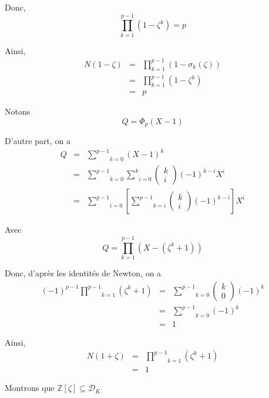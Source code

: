 Donc,
\[ \prod^{p - 1}_{k = 1} (1 - \zeta^k) = p \]


Ainsi,
\begin{eqnarray*}
  N (1 - \zeta) & = & \prod^{p - 1}_{k = 1} (1 - \sigma_k (\zeta))\\
  & = & \prod^{p - 1}_{k = 1} (1 - \zeta^k)\\
  & = & p
\end{eqnarray*}


Notons
\[ Q = \Phi_p (X - 1) \]


D'autre part, on a
\begin{eqnarray*}
  Q & = & \underset{k = 0}{\overset{p - 1}{\sum}} (X - 1)^k\\
  & = & \underset{k = 0}{\overset{p - 1}{\sum}} \underset{i =
  0}{\overset{k}{\sum}} \left( \begin{array}{c}
    k\\
    i
  \end{array} \right) (- 1)^{k - i} X^i\\
  & = & \underset{i = 0}{\overset{p - 1}{\sum}} \left[ \underset{k =
  i}{\overset{p - 1}{\sum}} \left( \begin{array}{c}
    k\\
    i
  \end{array} \right) (- 1)^{k - i} \right] X^i
\end{eqnarray*}


Avec
\[ Q = \underset{k = 1}{\overset{p - 1}{\prod}} (X - (\zeta^k + 1)) \]


Donc, d'apr{\`e}s les identit{\'e}s de Newton, on a
\begin{eqnarray*}
  (- 1)^{p - 1} \underset{k = 1}{\overset{p - 1}{\prod}} (\zeta^k + 1) & = &
  \underset{k = 0}{\overset{p - 1}{\sum}} \left( \begin{array}{c}
    k\\
    0
  \end{array} \right) (- 1)^k\\
  & = & \underset{k = 0}{\overset{p - 1}{\sum}} (- 1)^k\\
  & = & 1
\end{eqnarray*}


Ainsi,
\begin{eqnarray*}
  N (1 + \zeta) & = & \underset{k = 1}{\overset{p - 1}{\prod}} (\zeta^k + 1)\\
  & = & 1
\end{eqnarray*}


 Montrons que $\mathbb{Z} [\zeta] \subseteq \mathcal{D}_K$

